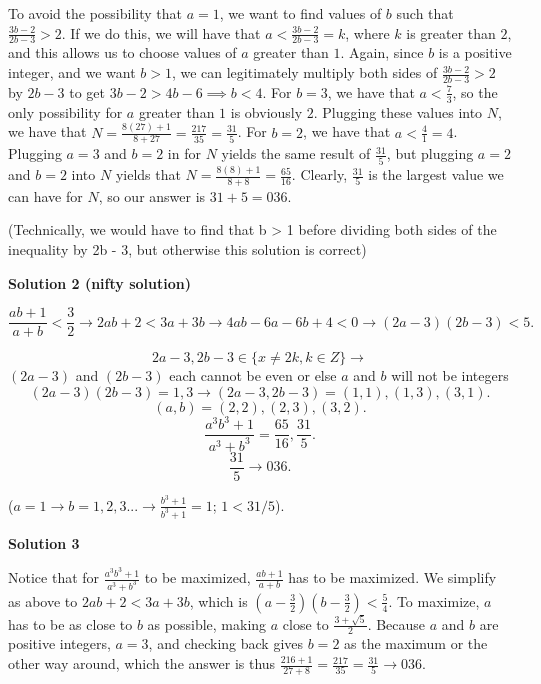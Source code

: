 \begin{enumerate}
 
To avoid the possibility that $a = 1$, we want to find values of $b$ such that $\frac{3b - 2}{2b - 3} > 2$. If we do this, we will have that $a < \frac{3b - 2}{2b - 3} = k$, where $k$ is greater than $2$, and this allows us to choose values of $a$ greater than $1$. Again, since $b$ is a positive integer, and we want $b > 1$, we can legitimately multiply both sides of $\frac{3b - 2}{2b - 3} > 2$ by $2b - 3$ to get $3b - 2 > 4b - 6 \implies b < 4$. For $b = 3$, we have that $a < \frac{7}{3}$, so the only possibility for $a$ greater than $1$ is obviously $2$. Plugging these values into $N$, we have that $N = \frac{8(27) + 1}{8 + 27} = \frac{217}{35} = \frac{31}{5}$. For $b = 2$, we have that $a < \frac{4}{1} = 4$. Plugging $a = 3$ and $b = 2$ in for $N$ yields the same result of $\frac{31}{5}$, but plugging $a = 2$ and $b = 2$ into $N$ yields that $N = \frac{8(8) + 1}{8 + 8} = \frac{65}{16}$. Clearly, $\frac{31}{5}$ is the largest value we can have for $N$, so our answer is $31 + 5 = \boxed{036}$.

 (Technically, we would have to find that b > 1 before dividing both sides of the inequality by 2b - 3, but otherwise this solution is correct)

 



\textbf{Solution 2 (nifty solution)}


 \[\frac{ab + 1}{a + b} < \frac{3}{2} \rightarrow 2ab + 2 < 3a + 3b \rightarrow 4ab - 6a - 6b + 4 < 0 \rightarrow (2a - 3)(2b - 3) < 5.\]

 \[2a - 3, 2b - 3 \in \{x \neq 2k, k \in Z \} \rightarrow\] $(2a-3)$ and $(2b-3)$ each cannot be even or else $a$ and $b$ will not be integers
 \[(2a - 3)(2b - 3) = 1, 3 \rightarrow (2a - 3, 2b - 3) = (1, 1), (1, 3), (3, 1).\]
 \[(a, b) = (2, 2), (2, 3), (3, 2).\]
 \[\frac{a^3 b^3 + 1}{a^3 + b^3} = \frac{65}{16}, \frac{31}{5}.\]
 \[\frac{31}{5} \rightarrow \boxed{036}.\]

 ($a=1 \rightarrow b=1, 2, 3... \rightarrow \frac{b^3+1}{b^3+1}=1$; $1<31/5$).

 



\textbf{Solution 3}

Notice that for $\frac{a^3b^3+1}{a^3+b^3}$ to be maximized, $\frac{ab+1}{a+b}$ has to be maximized. We simplify as above to $2ab + 2 < 3a + 3b$, which is $(a-\frac{3}{2})(b-\frac{3}{2}) < \frac{5}{4}$. To maximize, $a$ has to be as close to $b$ as possible, making $a$ close to $\frac{3+\sqrt{5}}{2}$. Because $a$ and $b$ are positive integers, $a = 3$, and checking back gives $b = 2$ as the maximum or the other way around, which the answer is thus $\frac{216+1}{27+8} = \frac{217}{35} = \frac{31}{5} \rightarrow \boxed{036}$.


\end{enumerate}
